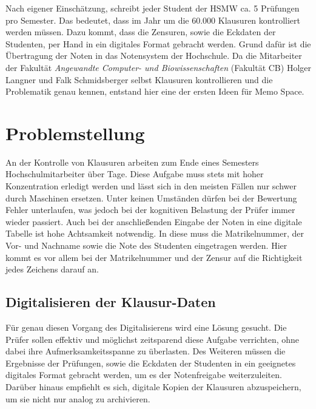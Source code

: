 \documentclass[notables, nomenclature, oneside, 150]{HSMW-Thesis}
\begin{document}
	Nach eigener Einschätzung, schreibt jeder Student der HSMW ca. 5 Prüfungen pro Semester. Das bedeutet, dass im Jahr um die 60.000 Klausuren kontrolliert werden müssen. Dazu kommt, dass die Zensuren, sowie die Eckdaten der Studenten, per Hand in ein digitales Format gebracht werden. Grund dafür ist die Übertragung der Noten in das Notensystem der Hochschule. Da die Mitarbeiter der Fakultät \textit{Angewandte Computer- und Biowissenschaften} (Fakultät CB) Holger Langner und Falk Schmidsberger selbst Klausuren kontrollieren und die Problematik genau kennen, entstand hier eine der ersten Ideen für Memo Space.


\chapter{Problemstellung}\label{ch:problemstellung}

	An der Kontrolle von Klausuren arbeiten zum Ende eines Semesters Hochschulmitarbeiter über Tage. Diese Aufgabe muss stets mit hoher Konzentration erledigt werden und lässt sich in den meisten Fällen nur schwer durch Maschinen ersetzen. Unter keinen Umständen dürfen bei der Bewertung Fehler unterlaufen, was jedoch bei der kognitiven Belastung der Prüfer immer wieder passiert. Auch bei der anschließenden Eingabe der Noten in eine digitale Tabelle ist hohe Achtsamkeit notwendig. In diese muss die Matrikelnummer, der Vor- und Nachname sowie die Note des Studenten eingetragen werden. Hier kommt es vor allem bei der Matrikelnummer und der Zensur auf die Richtigkeit jedes Zeichens darauf an. 
	
	\section{Digitalisieren der Klausur-Daten}
	Für genau diesen Vorgang des Digitalisierens wird eine Lösung gesucht. Die Prüfer sollen effektiv und möglichst zeitsparend diese Aufgabe verrichten, ohne dabei ihre Aufmerksamkeitsspanne zu überlasten. Des Weiteren müssen die Ergebnisse der Prüfungen, sowie die Eckdaten der Studenten in ein geeignetes digitales Format gebracht werden, um es der Notenfreigabe weiterzuleiten. Darüber hinaus empfiehlt es sich, digitale Kopien der Klausuren abzuspeichern, um sie nicht nur analog zu archivieren.
	
\end{document}
